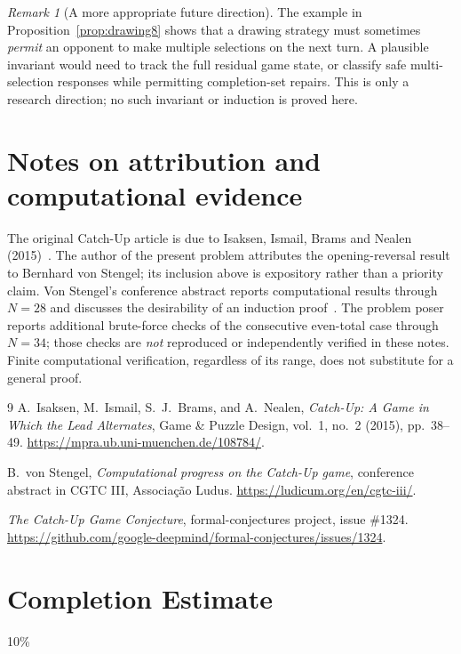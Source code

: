 \documentclass[11pt,a4paper]{article}
\theoremstyle{definition}
\theoremstyle{remark}
\newtheorem{remark}[theorem]{Remark}
\begin{document}
\begin{remark}[A more appropriate future direction]
The example in Proposition~\ref{prop:drawing8} shows that a drawing
strategy must sometimes \emph{permit} an opponent to make multiple
selections on the next turn.  A plausible invariant would need to
track the full residual game state, or classify safe multi-selection
responses while permitting completion-set repairs.  This is only a
research direction; no such invariant or induction is proved here.
\end{remark}

\section*{Notes on attribution and computational evidence}
The original Catch-Up article is due to Isaksen, Ismail, Brams and
Nealen (2015)~\cite{isaksen2015}.  The author of the present problem
attributes the opening-reversal result to Bernhard von Stengel; its
inclusion above is expository rather than a priority claim.
Von Stengel's conference abstract reports computational results
through $N=28$ and discusses the desirability of an induction
proof~\cite{vstengel2019}.  The problem poser reports additional
brute-force checks of the consecutive even-total case through
$N=34$; those checks are \emph{not} reproduced or independently
verified in these notes.  Finite computational verification,
regardless of its range, does not substitute for a general proof.

\begin{thebibliography}{9}
A.~Isaksen, M.~Ismail, S.~J.~Brams, and A.~Nealen,
\emph{Catch-Up: A Game in Which the Lead Alternates},
Game \& Puzzle Design, vol.~1, no.~2 (2015), pp.~38--49.
\url{https://mpra.ub.uni-muenchen.de/108784/}.

B.~von Stengel, \emph{Computational progress on the Catch-Up game},
conference abstract in CGTC III, Associa\c{c}\~ao Ludus.
\url{https://ludicum.org/en/cgtc-iii/}.

\emph{The Catch-Up Game Conjecture}, formal-conjectures project,
issue \#1324.
\url{https://github.com/google-deepmind/formal-conjectures/issues/1324}.
\end{thebibliography}
\section{Completion Estimate}
10\%
\end{document}
